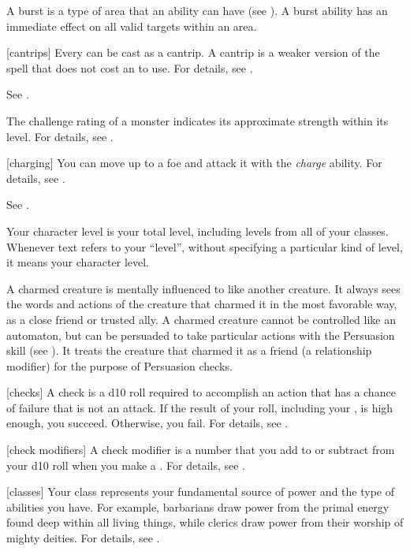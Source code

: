  A burst is a type of area that an ability can have (see ).
A burst ability has an immediate effect on all valid targets within an area.

[cantrips] Every  can be cast as a cantrip.
A cantrip is a weaker version of the spell that does not cost an  to use.
For details, see .

 See .

 The challenge rating of a monster indicates its approximate strength within its level.
For details, see .

[charging] You can move up to a foe and attack it with the \textit{charge} ability.
For details, see .

 See .

 Your character level is your total level, including levels from all of your classes.
Whenever text refers to your ``level'', without specifying a particular kind of level, it means your character level.

 A charmed creature is mentally influenced to like another creature.
It always sees the words and actions of the creature that charmed it in the most favorable way, as a close friend or trusted ally.
A charmed creature cannot be controlled like an automaton, but can be persuaded to take particular actions with the Persuasion skill (see ).
It treats the creature that charmed it as a friend (a  relationship modifier) for the purpose of Persuasion checks.

[checks] A check is a d10 roll required to accomplish an action that has a chance of failure that is not an attack.
If the result of your roll, including your , is high enough, you succeed.
Otherwise, you fail.
For details, see .

[check modifiers] A check modifier is a number that you add to or subtract from your d10 roll when you make a .
For details, see .

[classes] Your class represents your fundamental source of power and the type of abilities you have.
For example, barbarians draw power from the primal energy found deep within all living things, while clerics draw power from their worship of mighty deities.
For details, see .


